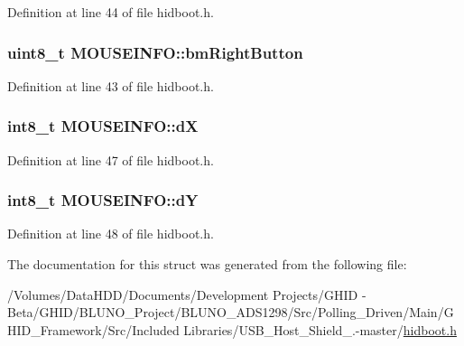 \-Definition at line 44 of file hidboot.\-h.

\hypertarget{struct_m_o_u_s_e_i_n_f_o_a07f604e1dffc0a72fa28e94a5094ebbe}{
\subsubsection[{bm\-Right\-Button}]{\setlength{\rightskip}{0pt plus 5cm}uint8\-\_\-t {\bf \-M\-O\-U\-S\-E\-I\-N\-F\-O\-::bm\-Right\-Button}}}\label{struct_m_o_u_s_e_i_n_f_o_a07f604e1dffc0a72fa28e94a5094ebbe}


\-Definition at line 43 of file hidboot.\-h.

\hypertarget{struct_m_o_u_s_e_i_n_f_o_a8b67db1c54e5db9782a0b5b707dcf9db}{
\subsubsection[{d\-X}]{\setlength{\rightskip}{0pt plus 5cm}int8\-\_\-t {\bf \-M\-O\-U\-S\-E\-I\-N\-F\-O\-::d\-X}}}\label{struct_m_o_u_s_e_i_n_f_o_a8b67db1c54e5db9782a0b5b707dcf9db}


\-Definition at line 47 of file hidboot.\-h.

\hypertarget{struct_m_o_u_s_e_i_n_f_o_ae7192500776548f5c6868cc37eaaabb2}{
\subsubsection[{d\-Y}]{\setlength{\rightskip}{0pt plus 5cm}int8\-\_\-t {\bf \-M\-O\-U\-S\-E\-I\-N\-F\-O\-::d\-Y}}}\label{struct_m_o_u_s_e_i_n_f_o_ae7192500776548f5c6868cc37eaaabb2}


\-Definition at line 48 of file hidboot.\-h.



\-The documentation for this struct was generated from the following file\-:\begin{DoxyCompactItemize}
\item 
/\-Volumes/\-Data\-H\-D\-D/\-Documents/\-Development Projects/\-G\-H\-I\-D -\/ Beta/\-G\-H\-I\-D/\-B\-L\-U\-N\-O\-\_\-\-Project/\-B\-L\-U\-N\-O\-\_\-\-A\-D\-S1298/\-Src/\-Polling\-\_\-\-Driven/\-Main/\-G\-H\-I\-D\-\_\-\-Framework/\-Src/\-Included Libraries/\-U\-S\-B\-\_\-\-Host\-\_\-\-Shield\-\_.-\/master/\hyperlink{hidboot_8h}{hidboot.\-h}\end{DoxyCompactItemize}
